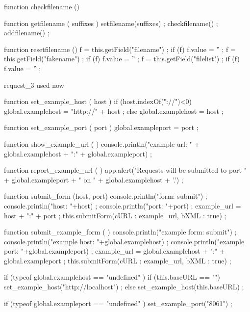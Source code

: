     function checkfilename () {
    }

    function getfilename ( suffixes ) {
        setfilename(suffixes) ;
        checkfilename() ;
        addfilename() ;
    }

    function resetfilename () {
        f = this.getField("filename") ;
        if (f) {
            f.value = '' ;
        }
        f = this.getField("fakename") ;
        if (f) {
            f.value = '' ;
        }
        f = this.getField("filelist") ;
        if (f) {
            f.value = '' ;
        }
    }

\stopJSpreamble

\startJSpreamble request_3 used now

    function set_example_host ( host ) {
        if (host.indexOf("://")<0) {
            global.examplehost = "http://" + host ;
        } else {
            global.examplehost = host ;
        }
    }

    function set_example_port ( port ) {
        global.exampleport = port ;
    }

    function show_example_url ( ) {
        console.println("example url: " + global.examplehost + ":" + global.exampleport) ;
    }

    function report_example_url ( ) {
        app.alert("Requests will be submitted to port " + global.exampleport + " on " + global.examplehost + '.') ;
    }

    function submit_form (host, port) {
        console.println("form: submit") ;
        console.println("host: "+host) ;
        console.println("port: "+port) ;
        example_url = host + ":" + port ;
        this.submitForm({cURL : example_url, bXML : true}) ;
    }

    function submit_example_form ( ) {
        console.println("example form: submit") ;
        console.println("example host: "+global.examplehost) ;
        console.println("example port: "+global.exampleport) ;
        example_url = global.examplehost + ":" + global.exampleport ;
        this.submitForm({cURL : example_url, bXML : true}) ;
    }

    if (typeof global.examplehost == "undefined" ) {
        if (this.baseURL == "") {
            set_example_host("http://localhost") ;
        } else {
            set_example_host(this.baseURL) ;
        }
    }

    if (typeof global.exampleport == "undefined" ) {
        set_example_port("8061") ;
    }

\stopJSpreamble

\endinput